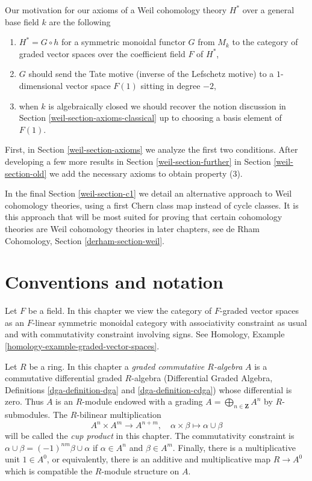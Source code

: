 \medskip\noindent
Our motivation for our axioms of a Weil cohomology theory $H^*$
over a general base field $k$ are the following
\begin{enumerate}
\item $H^* = G \circ h$ for a symmetric monoidal functor $G$ from $M_k$
to the category of graded vector spaces over the coefficient field $F$ of $H^*$,
\item $G$ should send the Tate motive (inverse of the Lefschetz motive)
to a $1$-dimensional vector space $F(1)$ sitting in degree $-2$,
\item when $k$ is algebraically closed we should recover the notion
discussion in Section \ref{weil-section-axioms-classical}
up to choosing a basis element of $F(1)$.
\end{enumerate}
First, in Section \ref{weil-section-axioms} we analyze the first two conditions.
After developing a few more results in Section \ref{weil-section-further}
in Section \ref{weil-section-old} we add the necessary axioms to obtain
property (3).

\medskip\noindent
In the final Section \ref{weil-section-c1} we detail an alternative approach
to Weil cohomology theories, using a first Chern class map
instead of cycle classes. It is this approach that will be most
suited for proving that certain cohomology theories are Weil cohomology
theories in later chapters, see
de Rham Cohomology, Section \ref{derham-section-weil}.

\section{Conventions and notation}
\label{weil-section-conventions}
Let $F$ be a field. In this chapter we view the category of $F$-graded vector
spaces as an $F$-linear symmetric monoidal category with associativity
constraint as usual and with commutativity constraint involving signs.
See Homology, Example \ref{homology-example-graded-vector-spaces}.

\medskip\noindent
Let $R$ be a ring. In this chapter a
{\it graded commutative $R$-algebra} $A$ is a
commutative differential graded $R$-algebra
(Differential Graded Algebra, Definitions \ref{dga-definition-dga} and
\ref{dga-definition-cdga}) whose differential is zero. Thus $A$
is an $R$-module endowed with a grading
$A = \bigoplus_{n \in \mathbf{Z}} A^n$ by
$R$-submodules. The $R$-bilinear multiplication
$$
A^n \times A^m \longrightarrow A^{n + m},\quad
\alpha \times \beta \longmapsto \alpha \cup \beta
$$
will be called the {\it cup product} in this chapter.
The commutativity constraint is
$\alpha \cup \beta = (-1)^{nm} \beta \cup \alpha$ if
$\alpha \in A^n$ and $\beta \in A^m$. Finally, there is
a multiplicative unit $1 \in A^0$, or equivalently, there is an
additive and multiplicative map $R \to A^0$ which is compatible the
$R$-module structure on $A$.

